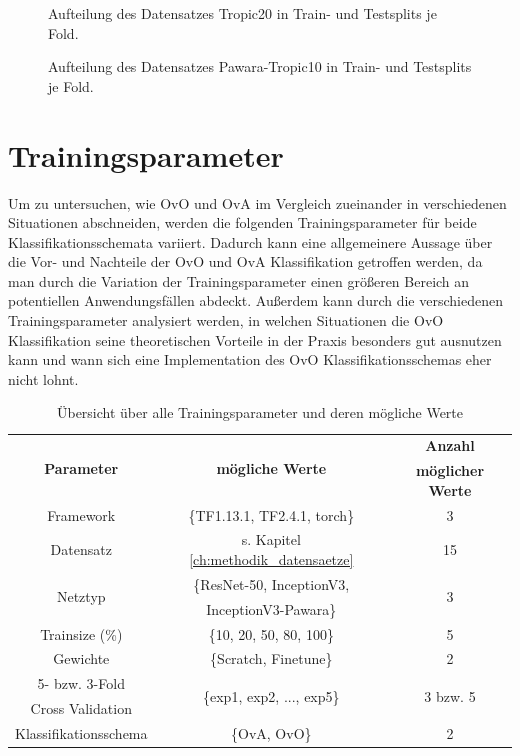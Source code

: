 \begin{figure}[H]
\begin{adjustbox}{width=1.2\textwidth, center}

\end{adjustbox}
\caption{Aufteilung des Datensatzes Tropic20 \cite{pawaraWebsiteDatensaetze} in Train- und Testsplits je Fold.}
\label{fig:tropic20Zusammensetzung}
\end{figure}
\begin{figure}[H]
\begin{adjustbox}{width=1.2\textwidth, center}

\end{adjustbox}
\caption{Aufteilung des Datensatzes Pawara-Tropic10 \cite{pawaraWebsiteDatensaetze} in Train- und Testsplits je Fold.}
\label{fig:pawaraTropic10Zusammensetzung}
\end{figure}


\section{Trainingsparameter}
\label{ch:methodik_parameter}
Um zu untersuchen, wie OvO und OvA im Vergleich zueinander in verschiedenen Situationen abschneiden, werden die folgenden Trainingsparameter für beide Klassifikationsschemata variiert.
Dadurch kann eine allgemeinere Aussage über die Vor- und Nachteile der OvO und OvA Klassifikation getroffen werden, da man durch die Variation der Trainingsparameter einen größeren Bereich an potentiellen Anwendungsfällen abdeckt.
Außerdem kann durch die verschiedenen Trainingsparameter analysiert werden, in welchen Situationen die OvO Klassifikation seine theoretischen Vorteile in der Praxis besonders gut ausnutzen kann und wann sich eine Implementation des OvO Klassifikationsschemas eher nicht lohnt.


\begin{table}[H]
\centering
\begin{tabular}{|c|c|c|}
\hline 
\multirow{2}{*}{\textbf{Parameter}} & \multirow{2}{*}{\textbf{mögliche Werte}} & \textbf{Anzahl} \\ 
& & \textbf{möglicher Werte} \\
\hline 
Framework & \{TF1.13.1, TF2.4.1, torch\} & 3\\
\hline
Datensatz & s. Kapitel \ref{ch:methodik_datensaetze} & 15\\
\hline 
\multirow{2}{*}{Netztyp} & \{ResNet-50, InceptionV3, & \multirow{2}{*}{3} \\
 & InceptionV3-Pawara\} & \\
\hline
Trainsize (\%) & \{10, 20, 50, 80, 100\}& 5 \\
\hline
Gewichte & \{Scratch, Finetune\} & 2 \\
\hline
5- bzw. 3-Fold & \multirow{2}{*}{\{exp1, exp2, ..., exp5\}} & \multirow{2}{*}{3 bzw. 5} \\
Cross Validation & & \\
\hline
Klassifikationsschema & \{OvA, OvO\} & 2 \\
\hline
\end{tabular} 
\caption{Übersicht über alle Trainingsparameter und deren mögliche Werte}
\label{tab:parameterUebersicht}
\end{table}

